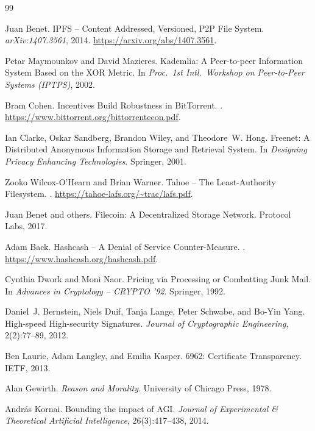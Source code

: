 \documentclass[11pt]{article}
\begin{document}
\begin{thebibliography}{99}

Juan Benet.
\newblock IPFS -- Content Addressed, Versioned, {P2P} File System.
\newblock \emph{arXiv:1407.3561}, 2014.
\newblock \url{https://arxiv.org/abs/1407.3561}.

Petar Maymounkov and David Mazieres.
\newblock Kademlia: A Peer-to-peer Information System Based on the XOR Metric.
\newblock In \emph{Proc.\ 1st Intl.\ Workshop on Peer-to-Peer Systems
  (IPTPS)}, 2002.

Bram Cohen.
\newblock Incentives Build Robustness in {BitTorrent}.
.
\newblock \url{https://www.bittorrent.org/bittorrentecon.pdf}.

Ian Clarke, Oskar Sandberg, Brandon Wiley, and Theodore~W. Hong.
\newblock Freenet: A Distributed Anonymous Information Storage and Retrieval
  System.
\newblock In \emph{Designing Privacy Enhancing Technologies}. Springer, 2001.

Zooko Wilcox-O'Hearn and Brian Warner.
\newblock Tahoe -- The Least-Authority Filesystem.
.
\newblock \url{https://tahoe-lafs.org/~trac/lafs.pdf}.

Juan Benet and others.
\newblock Filecoin: A Decentralized Storage Network.
\newblock Protocol Labs, 2017.

Adam Back.
\newblock Hashcash -- A Denial of Service Counter-Measure.
.
\newblock \url{https://www.hashcash.org/hashcash.pdf}.

Cynthia Dwork and Moni Naor.
\newblock Pricing via Processing or Combatting Junk Mail.
\newblock In \emph{Advances in Cryptology -- {CRYPTO} '92}. Springer, 1992.

Daniel~J. Bernstein, Niels Duif, Tanja Lange, Peter Schwabe, and Bo-Yin Yang.
\newblock High-speed High-security Signatures.
\newblock \emph{Journal of Cryptographic Engineering}, 2(2):77--89, 2012.

Ben Laurie, Adam Langley, and Emilia Kasper.
 6962: Certificate Transparency.
\newblock IETF, 2013.

Alan Gewirth.
\newblock \emph{Reason and Morality}.
\newblock University of Chicago Press, 1978.

Andr\'as Kornai.
\newblock Bounding the impact of AGI.
\newblock \emph{Journal of Experimental \& Theoretical Artificial
  Intelligence}, 26(3):417--438, 2014.

\end{thebibliography}
\end{document}

